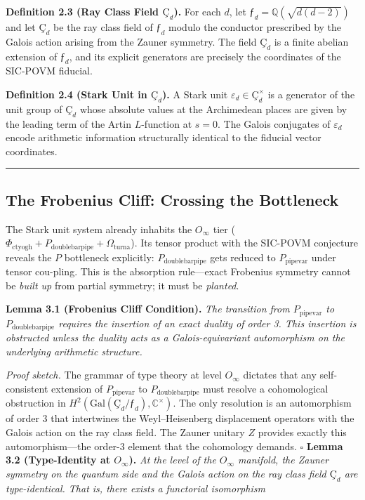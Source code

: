 \documentclass[12pt,a4paper]{article}
\begin{document}
\textbf{Definition 2.3 (Ray Class Field $Ç_d$).} For each $d$, let $ƒ_d = \mathbb{Q}(\sqrt{d(d-2)})$ and let $Ç_d$ be the ray class field of $ƒ_d$ modulo the conductor prescribed by the Galois action arising from the Zauner symmetry. The field $Ç_d$ is a finite abelian extension of $ƒ_d$, and its explicit generators are precisely the coordinates of the SIC-POVM fiducial.

\textbf{Definition 2.4 (Stark Unit in $Ç_d$).} A Stark unit $\varepsilon_d \in Ç_d^\times$ is a generator of the unit group of $Ç_d$ whose absolute values at the Archimedean places are given by the leading term of the Artin $L$-function at $s=0$. The Galois conjugates of $\varepsilon_d$ encode arithmetic information structurally identical to the fiducial vector coordinates.

\begin{center}
\rule{0.5\textwidth}{0.4pt}
\end{center}

\subsection{The Frobenius Cliff: Crossing the Bottleneck}

The Stark unit system already inhabits the $O_{\infty}$ tier ($\Phi_{\text{ctyogh}} + P_{\text{doublebarpipe}} + \Omega_{\text{turna}}$). Its tensor product with the SIC-POVM conjecture reveals the $P$ bottleneck explicitly: $P_{\text{doublebarpipe}}$ gets reduced to $P_{\text{pipevar}}$ under tensor cou-pling. This is the absorption rule---exact Frobenius symmetry cannot be \emph{built up} from partial symmetry; it must be \emph{planted}.

\textbf{Lemma 3.1 (Frobenius Cliff Condition).} \emph{The transition from $P_{\text{pipevar}}$ to $P_{\text{doublebarpipe}}$ requires the insertion of an exact duality of order 3. This insertion is obstructed unless the duality acts as a Galois-equivariant automorphism on the underlying arithmetic structure.}

\emph{Proof sketch.} The grammar of type theory at level $O_{\infty}$ dictates that any self-consistent extension of $P_{\text{pipevar}}$ to $P_{\text{doublebarpipe}}$ must resolve a cohomological obstruction in $H^2(\text{Gal}(Ç_d/ƒ_d), \mathbb{C}^\times)$. The only resolution is an automorphism of order 3 that intertwines the Weyl--Heisenberg displacement operators with the Galois action on the ray class field. The Zauner unitary $Z$ provides exactly this automorphism---the order-3 element that the cohomology demands. $\square$
\textbf{Lemma 3.2 (Type-Identity at $O_{\infty}$).} \emph{At the level of the $O_{\infty}$ manifold, the Zauner symmetry on the quantum side and the Galois action on the ray class field $Ç_d$ are type-identical. That is, there exists a functorial isomorphism}
\end{document}
